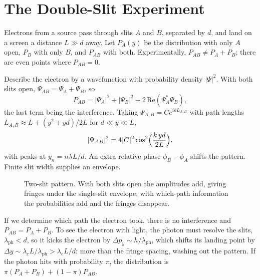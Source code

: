 \section{The Double-Slit Experiment}
\label{sec:double-slit}

Electrons from a source pass through slits $A$ and $B$, separated by $d$, and land on a screen a distance $L\gg d$ away. Let $P_A(y)$ be the distribution with only $A$ open, $P_B$ with only $B$, and $P_{AB}$ with both. Experimentally, $P_{AB}\neq P_A + P_B$; there are even points where $P_{AB} = 0$.

Describe the electron by a wavefunction with probability density $|\Psi|^2$. With both slits open, $\Psi_{AB} = \Psi_A + \Psi_B$, so
\[
    P_{AB} = |\Psi_A|^2 + |\Psi_B|^2 + 2\,\mathrm{Re}(\Psi_A^*\Psi_B),
\]
the last term being the interference. Taking $\Psi_{A,B} = Ce^{ikL_{A,B}}$ with path lengths $L_{A,B}\approx L + (y^2\mp yd)/2L$ for $d\ll y\ll L$,
\[
    |\Psi_{AB}|^2 = 4|C|^2\cos^2\Bigl(\frac{k\,yd}{2L}\Bigr),
\]
with peaks at $y_n = n\lambda L/d$. An extra relative phase $\phi_B-\phi_A$ shifts the pattern. Finite slit width supplies an envelope.

\begin{figure}[ht]
\centering
{}
\caption{Two-slit pattern. With both slits open the amplitudes add, giving fringes under the single-slit envelope; with which-path information the probabilities add and the fringes disappear.}
\end{figure}

\begin{fact}
If we determine which path the electron took, there is no interference and $P_{AB} = P_A + P_B$. To see the electron with light, the photon must resolve the slits, $\lambda_{\text{ph}}<d$, so it kicks the electron by $\Delta p_y\sim h/\lambda_{\text{ph}}$, which shifts its landing point by $\Delta y\sim\lambda_eL/\lambda_{\text{ph}}>\lambda_eL/d$: more than the fringe spacing, washing out the pattern. If the photon hits with probability $\pi$, the distribution is $\pi(P_A+P_B) + (1-\pi)P_{AB}$.
\end{fact}

